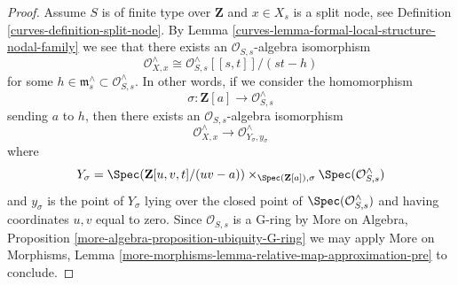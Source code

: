 \begin{proof}
\medskip\noindent
Assume $S$ is of finite type over $\mathbf{Z}$ and
$x \in X_s$ is a split node, see Definition \ref{curves-definition-split-node}.
By Lemma \ref{curves-lemma-formal-local-structure-nodal-family} we see that there
exists an $\mathcal{O}_{S, s}$-algebra isomorphism
$$
\mathcal{O}_{X, x}^\wedge \cong
\mathcal{O}_{S, s}^\wedge[[s, t]]/(st - h)
$$
for some $h \in \mathfrak m_s^\wedge \subset \mathcal{O}_{S, s}^\wedge$.
In other words, if we consider the homomorphism
$$
\sigma : \mathbf{Z}[a] \longrightarrow \mathcal{O}_{S, s}^\wedge
$$
sending $a$ to $h$, then there exists an $\mathcal{O}_{S, s}$-algebra
isomorphism
$$
\mathcal{O}_{X, x}^\wedge
\longrightarrow
\mathcal{O}_{Y_\sigma, y_\sigma}^\wedge
$$
where
$$
Y_\sigma = \Spec(\mathbf{Z}[u, v, t]/(uv - a))
\times_{\Spec(\mathbf{Z}[a]), \sigma} \Spec(\mathcal{O}_{S, s}^\wedge)
$$
and $y_\sigma$ is the point of $Y_\sigma$ lying over
the closed point of $\Spec(\mathcal{O}_{S, s}^\wedge)$
and having coordinates $u, v$ equal to zero. Since
$\mathcal{O}_{S, s}$ is a G-ring by
More on Algebra, Proposition \ref{more-algebra-proposition-ubiquity-G-ring}
we may apply More on Morphisms, Lemma
\ref{more-morphisms-lemma-relative-map-approximation-pre}
to conclude.
\end{proof}

